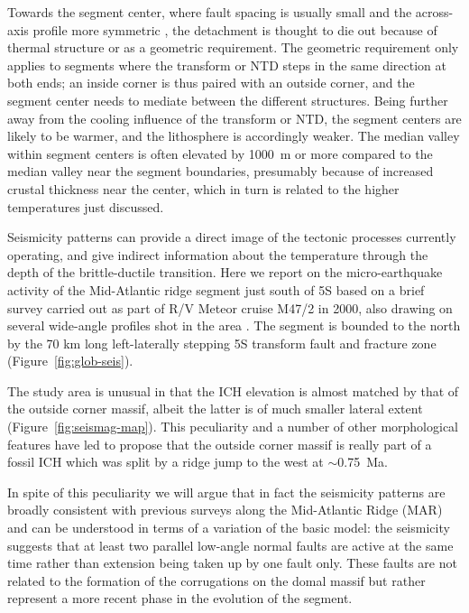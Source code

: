\documentclass[jgr]{agu2001}
\newlength{\tw}
\begin{document}
\begin{article}
Towards the segment center, where fault spacing is usually small and
the across-axis profile more symmetric \citep{shaw93}, the
detachment is thought to die out because of thermal structure or as a
geometric requirement.  The geometric requirement only applies to
segments where the transform or NTD steps in the same direction at
both ends; an inside corner is thus paired with an outside corner, and
the segment center needs to mediate between the different structures.
Being further away from the cooling influence of the transform or NTD,
the segment centers are likely to be warmer, and the lithosphere is
accordingly weaker.  The median valley within segment centers is often
elevated by 1000~m or more compared to the median valley near the
segment boundaries, presumably because of increased
crustal thickness near the center,
which in turn is related to the  higher temperatures just discussed.

Seismicity patterns can provide a direct image of the tectonic
processes currently operating, and give indirect information about the
temperature through the depth of the brittle-ductile transition.
Here we report on the micro-earthquake activity of the Mid-Atlantic
ridge segment just south of 5\dg S based on a brief survey carried out
as part of R/V Meteor
cruise M47/2 in 2000, also drawing on several wide-angle profiles shot
in the area \citep{planert-con03}.
The segment is bounded to the north by the 70 km long left-laterally
stepping 5\dg S transform fault and fracture zone
(Figure~\ref{fig:glob-seis}).  

 The study area is unusual in that the ICH elevation is almost matched
by that of the outside corner massif,
albeit the latter is of much smaller lateral extent
(Figure~\ref{fig:seismag-map}).  This peculiarity and a number of other
morphological features have led \citet{reston02} to propose that the
outside corner massif is really part of a fossil ICH which was split
by a ridge jump to the west at $\sim$0.75~Ma.  

  In spite of
this peculiarity we will argue that in fact the seismicity patterns  are
broadly consistent with previous surveys along the Mid-Atlantic Ridge (MAR) and can be
understood in terms of a variation of the basic
\citet{tucholke94} model:  the seismicity suggests
that at least two parallel low-angle normal faults are active at the same time
rather than extension being taken up by one fault only.  These
faults are not related to the formation of the corrugations on the
domal massif but rather represent a more recent phase in the evolution
of the segment.


\end{article}
\end{document}

